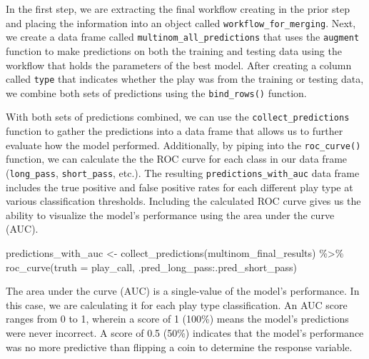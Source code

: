 \documentclass[
  letterpaper,
]{krantz}
\newenvironment{Shaded}{\begin{snugshade}}{\end{snugshade}}
\newcommand{\AttributeTok}[1]{\textcolor[rgb]{0.40,0.45,0.13}{#1}}
\newcommand{\FunctionTok}[1]{\textcolor[rgb]{0.28,0.35,0.67}{#1}}
\newcommand{\NormalTok}[1]{\textcolor[rgb]{0.00,0.23,0.31}{#1}}
\newcommand{\OtherTok}[1]{\textcolor[rgb]{0.00,0.23,0.31}{#1}}
\newcommand{\SpecialCharTok}[1]{\textcolor[rgb]{0.37,0.37,0.37}{#1}}
\begin{document}
In the first step, we are extracting the final workflow creating in the
prior step and placing the information into an object called
\texttt{workflow\_for\_merging}. Next, we create a data frame called
\texttt{multinom\_all\_predictions} that uses the \texttt{augment}
function to make predictions on both the training and testing data using
the workflow that holds the parameters of the best model. After creating
a column called \texttt{type} that indicates whether the play was from
the training or testing data, we combine both sets of predictions using
the \texttt{bind\_rows()} function.

With both sets of predictions combined, we can use the
\texttt{collect\_predictions} function to gather the predictions into a
data frame that allows us to further evaluate how the model performed.
Additionally, by piping into the \texttt{roc\_curve()} function, we can
calculate the the ROC curve for each class in our data frame
(\texttt{long\_pass}, \texttt{short\_pass}, etc.). The resulting
\texttt{predictions\_with\_auc} data frame includes the true positive
and false positive rates for each different play type at various
classification thresholds. Including the calculated ROC curve gives us
the ability to visualize the model's performance using the area under
the curve (AUC).

\begin{Shaded}
\begin{Highlighting}[]
\NormalTok{predictions\_with\_auc }\OtherTok{\textless{}{-}} \FunctionTok{collect\_predictions}\NormalTok{(multinom\_final\_results) }\SpecialCharTok{\%\textgreater{}\%}
  \FunctionTok{roc\_curve}\NormalTok{(}\AttributeTok{truth =}\NormalTok{ play\_call, .pred\_long\_pass}\SpecialCharTok{:}\NormalTok{.pred\_short\_pass)}
\end{Highlighting}
\end{Shaded}

\begin{tcolorbox}[enhanced jigsaw, left=2mm, toprule=.15mm, opacitybacktitle=0.6, leftrule=.75mm, bottomrule=.15mm, colbacktitle=quarto-callout-important-color!10!white, breakable, colback=white, bottomtitle=1mm, toptitle=1mm, title=\textcolor{quarto-callout-important-color}{\faExclamation}\hspace{0.5em}{Important}, coltitle=black, titlerule=0mm, arc=.35mm, opacityback=0, colframe=quarto-callout-important-color-frame, rightrule=.15mm]

The area under the curve (AUC) is a single-value of the model's
performance. In this case, we are calculating it for each play type
classification. An AUC score ranges from 0 to 1, wherein a score of 1
(100\%) means the model's predictions were never incorrect. A score of
0.5 (50\%) indicates that the model's performance was no more predictive
than flipping a coin to determine the response variable.

\end{tcolorbox}
\end{document}
